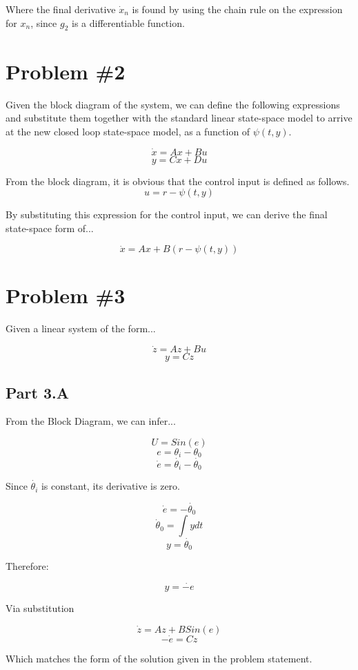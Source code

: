 \documentclass[12px]{article}
\begin{document}
Where the final derivative $\dot{x}_{n}$ is found by using the chain rule on the expression for $x_{n}$, since $g_2$ is a differentiable function.

    \section{Problem \#2}

    Given the block diagram of the system, we can define the following expressions and substitute them together with the standard linear state-space model to arrive at the new closed loop state-space model, as a function of $\psi(t, y)$.


        $$\dot{x} = A x + Bu $$
        $$y = Cx + Du $$

From the block diagram, it is obvious that the control input is defined as follows.
    $$ u = r - \psi(t,y) $$

By substituting this expression for the control input, we can derive the final state-space form of...

$$  \dot{x} = Ax + B\left( r - \psi(t,y) \right) $$


    \section{Problem \#3}

    Given a linear system of the form...

    $$\dot{z} = Az + Bu $$
    $$ y = Cz $$

    \subsection{Part 3.A}

    From the Block Diagram, we can infer...

    $$ U = Sin(e)$$
    $$ e = \theta_{i} - \theta_{0}$$
    $$\dot{e} = \dot{\theta_{i}} - \dot{\theta_{0}}$$

    \noindent Since $\dot{\theta_{i}}$ is constant, its derivative is zero.

    $$ \dot{e} =  - \dot{\theta_{0}} $$
    $$ \dot{\theta}_{0} = \int y dt $$
    $$ y = \dot{\theta_{0}} $$

    Therefore:

    $$ y = \dot{-e} $$

    Via substitution

    $$ \dot{z} = Az + BSin(e) $$
    $$ -\dot{e} = Cz $$

    Which matches the form of the solution given in the problem statement.
\end{document}

